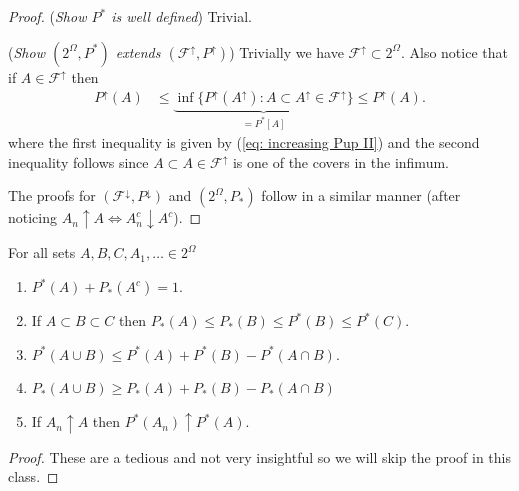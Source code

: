 \begin{proof}
({\sl Show $P^*$ is well defined}) Trivial.


({\sl Show $(2^\Omega, P^*)$ extends $(\mathcal F^\uparrow, P^\uparrow)$}) Trivially we have $\mathcal F^\uparrow \subset 2^\Omega$. Also notice that  if $A \in \mathcal F^\uparrow$ then
\begin{align*}
P^\uparrow(A) &\leq \underbrace{\inf\{P^\uparrow(A^\uparrow): A\subset A^\uparrow\in \mathcal F^\uparrow  \}}_{ = P^*[A]} \leq P^\uparrow(A).
\end{align*}
where the first inequality is given by (\ref{eq: increasing Pup II}) and the second inequality follows since $A\subset A\in \mathcal F^\uparrow$ is one of the covers in the infimum.

The proofs for $(\mathcal F^\downarrow, P^\downarrow)$ and $(2^\Omega, P_*)$ follow in a similar manner (after noticing $A_n\uparrow A \Longleftrightarrow A_n^c \downarrow A^c$).

\end{proof}


\begin{theorem}
\label{f5}
For all sets $A, B,C, A_1, \ldots\in 2^\Omega$
\begin{enumerate}
\item\label{eff1}  $P^* (A) + P_*(A^c) = 1$.
\item\label{eff2}  If $A\subset B\subset C$ then $P_* (A)\leq P_*(B)\leq P^*(B)\leq P^*(C)$.
\item\label{eff3}  $P^*(A\cup B)\leq P^*(A) + P^*(B) - P^*(A\cap B)$.
\item\label{eff4}  $P_*(A\cup B)\geq P_*(A) + P_*(B) - P_*(A\cap B)$
\item\label{eff6} If $ A_n \uparrow A$ then $P^*(A_n)\uparrow P^*(A)$.
\end{enumerate}
\end{theorem}
\begin{shaded}
\begin{proof}
These are a tedious and not very insightful so we will skip the proof in this class.
\end{proof}
\end{shaded}


